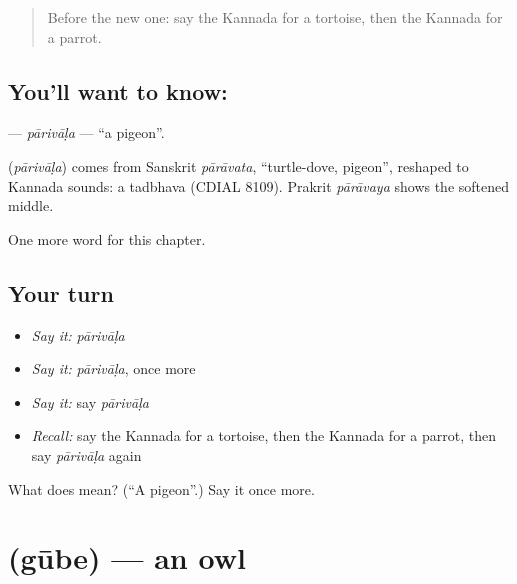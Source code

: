 \label{lesson:KA-C131-parivala}



\begin{quote}
Before the new one: say the Kannada for a tortoise, then the Kannada for a parrot.
\end{quote}

\subsection*{You'll want to know: }
\textbf{} — \emph{pārivāḷa} — \textquotedblleft{}a pigeon\textquotedblright{}.

\begin{cousinweb}
\textbf{} (\emph{pārivāḷa}) comes from Sanskrit \emph{pārāvata}, \textquotedblleft{}turtle-dove, pigeon\textquotedblright{}, reshaped to Kannada sounds: a tadbhava (CDIAL 8109). Prakrit \emph{pārāvaya} shows the softened middle.
\end{cousinweb}

\begin{grammarlens}[title={What you've built}]
One more word for this chapter.
\end{grammarlens}

\subsection*{Your turn}
\begin{itemize}
\raggedright
  \item \emph{Say it:} \emph{pārivāḷa}
  \item \emph{Say it:} \emph{pārivāḷa}, once more
  \item \emph{Say it:} say \emph{pārivāḷa}
  \item \emph{Recall:} say the Kannada for a tortoise, then the Kannada for a parrot, then say \emph{pārivāḷa} again
\end{itemize}

\begin{tcolorbox}[breakable,colback=teal!4,colframe=teal!35!black,title={Before you move on}]
What does  mean? (\textquotedblleft{}A pigeon\textquotedblright{}.) Say it once more.
\end{tcolorbox}
\section[\texorpdfstring{\kn{ಗೂಬೆ} (gūbe)}{ಗೂಬೆ (gūbe)}]{ (gūbe) — an owl}

